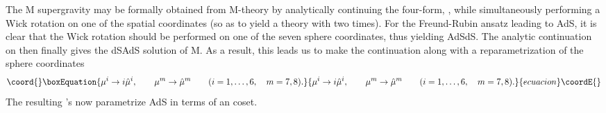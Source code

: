 \documentclass[a4paper,12pt]{article}
\begin{document}
The M\coordHE{} supergravity may be formally obtained from M-theory by
analytically continuing the four-form, \coordHE{}, while
simultaneously performing a Wick rotation on one of the spatial
coordinates (so as to yield a theory with two times).  For the
Freund-Rubin ansatz leading to AdS\coordHE{}, it is clear that the
Wick rotation should be performed on one of the seven sphere
coordinates, thus yielding AdS\myHighlight{$_4\times$}\coordHE{}dS\coordHE{}.  The analytic
continuation on \coordHE{} then finally gives the dS\myHighlight{$_4\times$}\coordHE{}AdS\coordHE{}
solution of M\coordHE{}.  As a result, this leads us to make the
continuation \coordHE{} along with a reparametrization of the sphere
coordinates
%
\begin{equation}\coord{}\boxEquation{
\mu^i\to i\hat \mu^i,\qquad \mu^m\to\hat\mu^m\qquad
(i=1,\ldots,6,\quad m=7,8).
}{
\mu^i\to i\hat \mu^i,\qquad \mu^m\to\hat\mu^m\qquad
(i=1,\ldots,6,\quad m=7,8).
}{ecuacion}\coordE{}\end{equation}
%
The resulting \myHighlight{$\hat\mu$}\coordHE{}'s now parametrize AdS\coordHE{} in terms of an
\coordHE{} coset.
\end{document}
